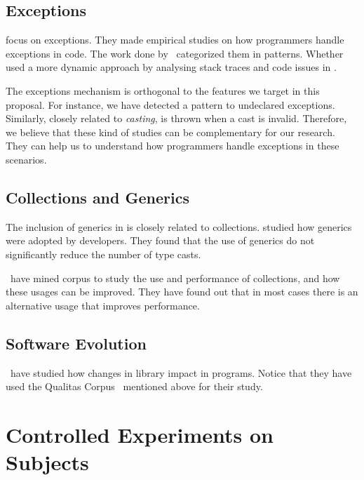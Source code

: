\subsection*{Exceptions}

\cite{kery_examining_2016,asaduzzaman_how_2016} focus on exceptions.
They made empirical studies on how programmers handle exceptions in \java{} code.
The work done by~\cite{nakshatri_analysis_2016} categorized them in patterns.
Whether~\cite{coelho_unveiling_2015} used a more dynamic approach by analysing stack traces and code issues in \github{}.

The exceptions mechanism is orthogonal to the features we target in this proposal.
For instance, we have detected a \smu{} pattern to \throw{} undeclared exceptions.
Similarly, closely related to \emph{casting}, \cce{} is thrown when a cast is invalid.
Therefore, we believe that these kind of studies can be complementary for our research. They can help us to understand how programmers handle exceptions in these scenarios.


\subsection*{Collections and Generics}

The inclusion of generics in \java{} is closely related to collections.
\cite{parnin_java_2011,parnin_adoption_2013} studied how generics were adopted by \java{} developers.
They found that the use of generics do not significantly reduce the number of type casts.

\cite{costa_empirical_2017}~have mined \github{} corpus to study the use and performance of collections, and how these usages can be improved.
They have found out that in most cases there is an alternative usage that improves performance.


\subsection*{Software Evolution}

\cite{dietrich_broken_2014}~have studied how changes in \api{} library impact in \java{} programs.
Notice that they have used the Qualitas Corpus~\cite{tempero_qualitas_2010} mentioned above for their study.

\section{Controlled Experiments on Subjects}


